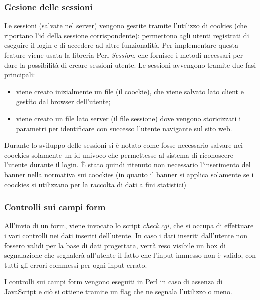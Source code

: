 \subsubsection{Gesione delle sessioni}
Le sessioni (salvate nel server) vengono gestite tramite l'utilizzo di cookies (che riportano l'id della sessione corrispondente): permettono agli utenti registrati di eseguire il login e di accedere ad altre funzionalit\`a.
Per implementare questa feature viene usata la libreria Perl \textit{Session}, che fornisce i metodi necessari per dare la possibilit\`a di creare sessioni utente. Le sessioni avvengono tramite due fasi principali:
\begin{itemize}

    \item viene creato inizialmente un file (il coockie), che viene salvato lato client e gestito dal browser dell'utente;
    \item viene creato un file lato server (il file sessione) dove vengono storicizzati i parametri per identificare con successo l'utente navigante sul sito web.

\end{itemize}

Durante lo sviluppo delle sessioni si \`e notato come fosse necessario salvare nei coockies solamente un id univoco che permettesse al sistema di riconoscere l'utente durante il login. \`E stato quindi ritenuto non necessario l'inserimento del banner nella normativa sui coockies (in quanto il banner si applica solamente se i coockies si utilizzano per la raccolta di dati a fini statistici)

\subsubsection{Controlli sui campi form}
All'invio di un form, viene invocato lo script \textit{check.cgi}, che si occupa di effettuare i vari controlli nei dati inseriti dell'utente. In caso i dati inseriti dall'utente non fossero validi per la base di dati progettata, verr\`a reso visibile un box di segnalazione che segnaler\`a all'utente il fatto che  l'input immesso non \`e valido, con tutti gli errori commessi per ogni input errato.

I controlli sui campi form vengono eseguiti in Perl in caso di assenza di JavaScript e ci\`o si ottiene tramite un flag che ne segnala l'utilizzo o meno.
